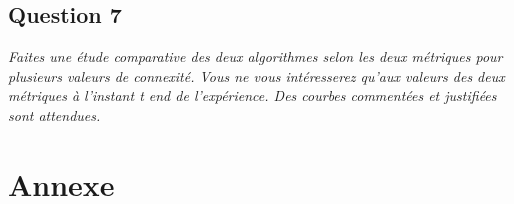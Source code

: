 \documentclass[11pt,a4paper,sans]{report}
\begin{document}
	\section{Question 7}
	\textit{Faites une étude comparative des deux algorithmes selon les deux métriques pour plusieurs valeurs de connexité. Vous ne vous intéresserez qu’aux valeurs des deux métriques à l’instant t end de l’expérience. Des courbes commentées et justifiées sont attendues.}







	\newpage
	\chapter{Annexe}
\end{document}
